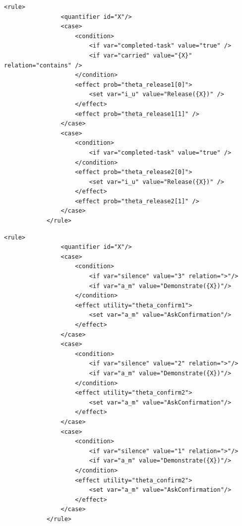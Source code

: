 \begin{lstlisting}[label=listing:xml1,caption=Example of probability rule in XML format., float=p,captionpos=b]
            <rule>
                <quantifier id="X"/>
                <case>
                    <condition>
                        <if var="completed-task" value="true" />
                        <if var="carried" value="{X}" relation="contains" />
                    </condition>
                    <effect prob="theta_release1[0]">
                        <set var="i_u" value="Release({X})" />
                    </effect>
                    <effect prob="theta_release1[1]" />
                </case>
                <case>
                    <condition>
                        <if var="completed-task" value="true" />
                    </condition>
                    <effect prob="theta_release2[0]">
                        <set var="i_u" value="Release({X})" />
                    </effect>
                    <effect prob="theta_release2[1]" />
                </case>
            </rule>
\end{lstlisting}


\begin{lstlisting}[label=listing:xml2,caption=Example of utility rule in XML format., float=p,captionpos=b]
            <rule>
                <quantifier id="X"/>
                <case>
                    <condition>
                        <if var="silence" value="3" relation=">"/>
                        <if var="a_m" value="Demonstrate({X})"/>
                    </condition>
                    <effect utility="theta_confirm1">
                        <set var="a_m" value="AskConfirmation"/>
                    </effect>
                </case>
                <case>
                    <condition>
                        <if var="silence" value="2" relation=">"/>
                        <if var="a_m" value="Demonstrate({X})"/>
                    </condition>
                    <effect utility="theta_confirm2">
                        <set var="a_m" value="AskConfirmation"/>
                    </effect>
                </case>
                <case>
                    <condition>
                        <if var="silence" value="1" relation=">"/>
                        <if var="a_m" value="Demonstrate({X})"/>
                    </condition>
                    <effect utility="theta_confirm2">
                        <set var="a_m" value="AskConfirmation"/>
                    </effect>
                </case>
            </rule>
\end{lstlisting}

